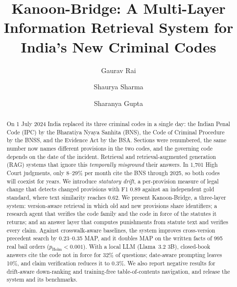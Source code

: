 \documentclass[sigconf,nonacm]{acmart}
\newcommand{\ph}{p_{\text{Holm}}}
\begin{document}
\title{Kanoon-Bridge: A Multi-Layer Information Retrieval System for India's New Criminal Codes}

\author{Gaurav Rai}
\author{Shaurya Sharma}
\author{Sharanya Gupta}

\begin{abstract}
On 1 July 2024 India replaced its three criminal codes in a single day: the Indian Penal Code
(IPC) by the Bharatiya Nyaya Sanhita (BNS), the Code of Criminal Procedure by the BNSS, and the
Evidence Act by the BSA. Sections were renumbered, the same number now names different provisions
in the two codes, and the governing code depends on the date of the incident. Retrieval and
retrieval-augmented generation (RAG) systems that ignore this \emph{temporally misground} their
answers. In 1,701 High Court judgments, only 8--29\% per
month cite the BNS through 2025, so both codes will coexist for years. We introduce
\emph{statutory drift}, a per-provision measure of legal change that detects changed provisions
with F1 0.89 against an independent gold standard, where text similarity reaches 0.62. We present
Kanoon-Bridge, a three-layer system: version-aware retrieval in which old and new provisions share
identifiers; a research agent that verifies the code family and the code in force of the statutes
it returns; and an answer layer that computes punishments from statute text and verifies every
claim. Against crosswalk-aware baselines, the system improves cross-version precedent search by
0.23--0.35 MAP, and it doubles MAP on the written facts of 995 real bail orders ($\ph<0.001$). With
a local LLM (Llama~3.2 3B), closed-book answers cite the code not in force for 32\% of questions;
date-aware prompting leaves 10\%, and claim verification reduces it to 0.3\%. We also report
negative results for drift-aware down-ranking and training-free table-of-contents navigation, and
release the system and its benchmarks.
\end{abstract}


\maketitle

\end{document}
